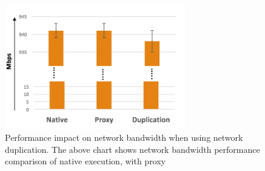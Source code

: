 \begin{figure}[!ht]
	\begin{center}
		\includegraphics[width=0.7\textwidth]{parikshan/figs/Bandwidth.png}
		\caption{Performance impact on network bandwidth when using network duplication. The above chart shows network bandwidth performance comparison of native execution, with proxy}
		\label{fig:performanceBandwidth}
	\end{center}
\end{figure}

